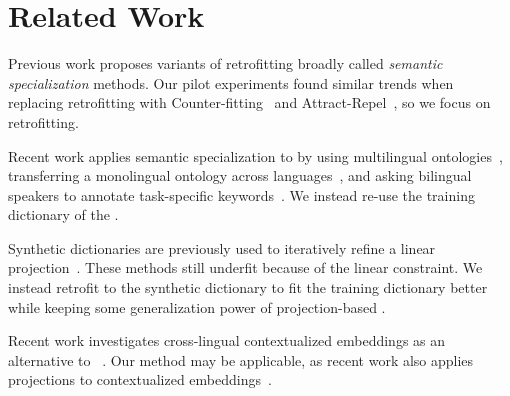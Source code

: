 \section{Related Work}

Previous work proposes variants of retrofitting broadly called \emph{semantic
specialization} methods.
Our pilot experiments found similar trends when replacing retrofitting with
Counter-fitting~\citep{mrksic-16} and Attract-Repel~\citep{mrksic-17}, so we
focus on retrofitting. 

Recent work applies semantic specialization to  by using multilingual
ontologies~\citep{mrksic-17}, transferring a monolingual ontology across
languages~\citep{ponti-19}, and asking bilingual speakers to annotate
task-specific keywords~\citep{yuan-19b}.
We instead re-use the training dictionary of the .

Synthetic dictionaries are previously used to iteratively refine a linear
projection~\citep{artetxe-17,conneau-18}.
These methods still underfit because of the linear constraint.
We instead retrofit to the synthetic dictionary to fit the training dictionary
better while keeping some generalization power of projection-based .

Recent work investigates cross-lingual contextualized embeddings as an
alternative to
~\citep{eisenschlos-19,lample-19,huang-19,wu-19,conneau-20}.
Our method may be applicable, as recent work also applies projections to
contextualized embeddings~\citep{aldarmaki-19,schuster-19,wang-20,wu-20}.

